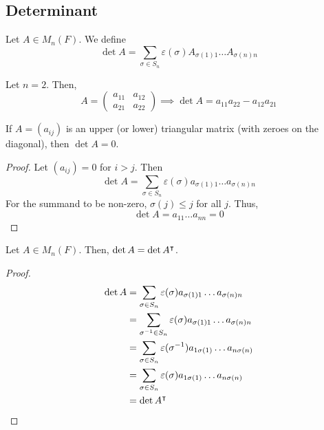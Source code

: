 \subsection{Determinant}
\begin{definition}
	Let \( A \in M_n(F) \).
	We define
	\[
		\det A = \sum_{\sigma \in S_n} \varepsilon(\sigma) A_{\sigma(1) 1} \dots A_{\sigma(n) n}
	\]
\end{definition}
\begin{example}
	Let \( n = 2 \).
	Then,
	\[
		A = \begin{pmatrix} a_{11} & a_{12} \\ a_{21} & a_{22} \end{pmatrix} \implies \det A = a_{11} a_{22} - a_{12} a_{21}
	\]
\end{example}
\begin{lemma}
	If \( A = (a_{ij}) \) is an upper (or lower) triangular matrix (with zeroes on the diagonal), then \( \det A = 0 \).
\end{lemma}
\begin{proof}
	Let \( (a_{ij}) = 0 \) for \( i > j \).
	Then
	\[
		\det A = \sum_{\sigma \in S_n} \varepsilon(\sigma) a_{\sigma(1) 1} \dots a_{\sigma(n) n}
	\]
	For the summand to be non-zero, \( \sigma(j) \leq j \) for all \( j \).
	Thus,
	\[
		\det A = a_{1 1} \dots a_{n n} = 0
	\]
\end{proof}
\begin{lemma}
	Let \( A \in M_n(F) \).
	Then, \( \det A = \det A^\intercal \).
\end{lemma}
\begin{proof}
	\begin{align*}
		\det A & = \sum_{\sigma \in S_n} \varepsilon(\sigma) a_{\sigma(1) 1} \dots a_{\sigma(n) n}      \\
		       & = \sum_{\sigma^{-1} \in S_n} \varepsilon(\sigma) a_{\sigma(1) 1} \dots a_{\sigma(n) n} \\
		       & = \sum_{\sigma \in S_n} \varepsilon(\sigma^{-1}) a_{1 \sigma(1)} \dots a_{n \sigma(n)} \\
		       & = \sum_{\sigma \in S_n} \varepsilon(\sigma) a_{1 \sigma(1)} \dots a_{n \sigma(n)}      \\
		       & = \det A^\intercal
	\end{align*}
\end{proof}

